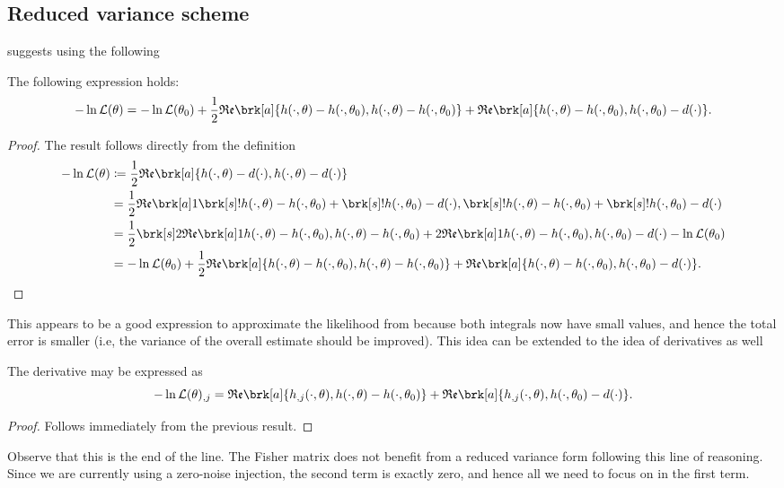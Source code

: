 \subsection{Reduced variance scheme}
\cite{Cornish_2021} suggests using the following
\begin{proposition}[]\label{}
The following expression holds:
\begin{equation}\label{}
- \ln \like(\theta) = -\ln \like(\theta_0) + \frac{1}{2} \re \brk[a]{h(\cdot,\theta) - h(\cdot,\theta_0), h(\cdot,\theta) - h(\cdot,\theta_0)} + \re \brk[a]{h(\cdot,\theta) - h(\cdot,\theta_0), h(\cdot,\theta_0) - d(\cdot)}.
\end{equation}
\end{proposition}
\begin{proof}
The result follows directly from the definition
\begin{align*}
-\ln \like(\theta) &\defn \frac{1}{2} \re \brk[a]{h(\cdot,\theta) - d(\cdot), h(\cdot,\theta)-d(\cdot)} \\
&= \frac{1}{2} \re \brk[a]1{\brk[s]!{h(\cdot,\theta) - h(\cdot,\theta_0)} + \brk[s]!{h(\cdot, \theta_0) - d(\cdot)}, \brk[s]!{h(\cdot, \theta) - h(\cdot,\theta_0)} + \brk[s]!{h(\cdot,\theta_0) - d(\cdot)}} \\
&= \frac{1}{2} \brk[s]2{\re \brk[a]1{h(\cdot,\theta) - h(\cdot,\theta_0), h(\cdot,\theta) - h(\cdot,\theta_0)} + 2 \re \brk[a]1{h(\cdot,\theta) - h(\cdot,\theta_0), h(\cdot,\theta_0) - d(\cdot)}} - \ln \like (\theta_0) \\
&= -\ln \like(\theta_0) + \frac{1}{2} \re \brk[a]{h(\cdot,\theta) - h(\cdot,\theta_0), h(\cdot,\theta) - h(\cdot,\theta_0)} + \re \brk[a]{h(\cdot,\theta) - h(\cdot,\theta_0), h(\cdot,\theta_0) - d(\cdot)}.
\end{align*}
\end{proof}
This appears to be a good expression to approximate the likelihood from because both integrals now have small values, and hence the total error is smaller (i.e, the variance of the overall estimate should be improved).
This idea can be extended to the idea of derivatives as well
\begin{corollary}[]\label{}
The derivative may be expressed as
\begin{equation}\label{}
- \ln \like(\theta)_{,j} = \re \brk[a]{h_{,j}(\cdot,\theta), h(\cdot,\theta) - h(\cdot, \theta_0)} + \re \brk[a]{h_{,j}(\cdot,\theta), h(\cdot,\theta_0) - d(\cdot)}.
\end{equation}
\end{corollary}
\begin{proof}
Follows immediately from the previous result.
\end{proof}
Observe that this is the end of the line.
The Fisher matrix does not benefit from a reduced variance form following this line of reasoning.
Since we are currently using a zero-noise injection, the second term is exactly zero, and hence all we need to focus on in the first term.

